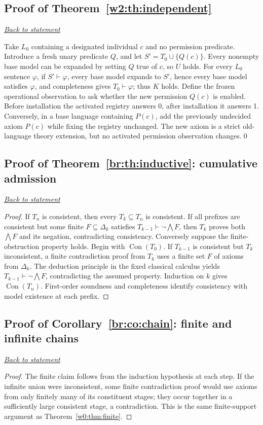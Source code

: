 \documentclass[11pt,letterpaper]{article}
\theoremstyle{definition}\newtheorem{definition}[theorem]{Definition}\newtheorem{example}[theorem]{Example}
\theoremstyle{remark}\newtheorem{remark}[theorem]{Remark}
\newcommand{\Con}{\operatorname{Con}}
\newcommand{\backlink}[1]{\noindent\hyperref[#1]{\textit{Back to statement}}\par\smallskip}
\begin{document}
\subsection{Proof of Theorem~\ref{w2:th:independent}}\label{w2:pr:independent}\backlink{w2:th:independent}
Take $L_0$ containing a designated individual $c$ and no permission predicate. Introduce a fresh unary predicate $Q$, and let $S'=T_0\cup\{Q(c)\}$. Every nonempty base model can be expanded by setting $Q$ true of $c$, so $U$ holds. For every $L_0$ sentence $\varphi$, if $S'\vdash\varphi$, every base model expands to $S'$, hence every base model satisfies $\varphi$, and completeness gives $T_0\vdash\varphi$; thus $K$ holds. Define the frozen operational observation to ask whether the new permission $Q(c)$ is enabled. Before installation the activated registry answers 0, after installation it answers 1. Conversely, in a base language containing $P(c)$, add the previously undecided axiom $P(c)$ while fixing the registry unchanged. The new axiom is a strict old-language theory extension, but no activated permission observation changes.\qed


\subsection{Proof of Theorem~\ref{br:th:inductive}: cumulative admission}\label{br:pr:inductive}
\backlink{br:th:inductive}
\begin{proof}
If $T_n$ is consistent, then every $T_k\subseteq T_n$ is consistent.
If all prefixes are consistent but some finite $F\subseteq\Delta_k$ satisfies
$T_{k-1}\vdash\neg\bigwedge F$, then $T_k$ proves both $\bigwedge F$
and its negation, contradicting consistency. Conversely suppose the
finite-obstruction property holds. Begin with $\Con(T_0)$. If $T_{k-1}$
is consistent but $T_k$ inconsistent, a finite contradiction proof from
$T_k$ uses a finite set $F$ of axioms from $\Delta_k$. The deduction
principle in the fixed classical calculus yields
$T_{k-1}\vdash\neg\bigwedge F$, contradicting the assumed property.
Induction on $k$ gives $\Con(T_n)$. First-order soundness and completeness
identify consistency with model existence at each prefix.
\end{proof}


\subsection{Proof of Corollary~\ref{br:co:chain}: finite and infinite chains}\label{br:pr:chain}
\backlink{br:co:chain}
\begin{proof}
The finite claim follows from the induction hypothesis at each step.
If the infinite union were inconsistent, some finite contradiction proof
would use axioms from only finitely many of its constituent stages;
they occur together in a sufficiently large consistent stage, a
contradiction.  This is the same finite-support argument as
Theorem~\ref{w0:thm:finite}.
\end{proof}
\end{document}
